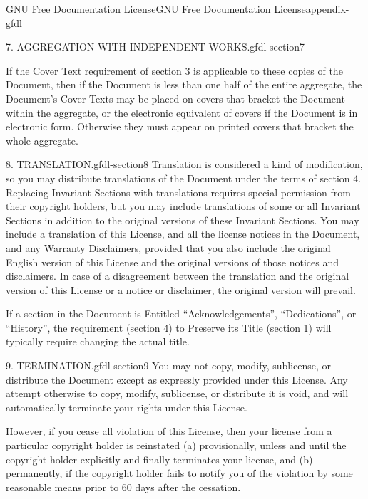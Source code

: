 \documentclass[oneside,10pt,]{book}
\numberwithin{equation}{section}
\begin{document}
\begin{appendixptx}{GNU Free Documentation License}{}{GNU Free Documentation License}{}{}{appendix-gfdl}
\begin{paragraphs}{7. AGGREGATION WITH INDEPENDENT WORKS.}{gfdl-section7}
\par
\hypertarget{p-1604}{}%
If the Cover Text requirement of section 3 is applicable to these copies of the Document, then if the Document is less than one half of the entire aggregate, the Document's Cover Texts may be placed on covers that bracket the Document within the aggregate, or the electronic equivalent of covers if the Document is in electronic form. Otherwise they must appear on printed covers that bracket the whole aggregate.%
\end{paragraphs}%
\begin{paragraphs}{8. TRANSLATION.}{gfdl-section8}%
\hypertarget{p-1605}{}%
Translation is considered a kind of modification, so you may distribute translations of the Document under the terms of section 4. Replacing Invariant Sections with translations requires special permission from their copyright holders, but you may include translations of some or all Invariant Sections in addition to the original versions of these Invariant Sections. You may include a translation of this License, and all the license notices in the Document, and any Warranty Disclaimers, provided that you also include the original English version of this License and the original versions of those notices and disclaimers. In case of a disagreement between the translation and the original version of this License or a notice or disclaimer, the original version will prevail.%
\par
\hypertarget{p-1606}{}%
If a section in the Document is Entitled ``Acknowledgements'', ``Dedications'', or ``History'', the requirement (section 4) to Preserve its Title (section 1) will typically require changing the actual title.%
\end{paragraphs}%
\begin{paragraphs}{9. TERMINATION.}{gfdl-section9}%
\hypertarget{p-1607}{}%
You may not copy, modify, sublicense, or distribute the Document except as expressly provided under this License. Any attempt otherwise to copy, modify, sublicense, or distribute it is void, and will automatically terminate your rights under this License.%
\par
\hypertarget{p-1608}{}%
However, if you cease all violation of this License, then your license from a particular copyright holder is reinstated (a) provisionally, unless and until the copyright holder explicitly and finally terminates your license, and (b) permanently, if the copyright holder fails to notify you of the violation by some reasonable means prior to 60 days after the cessation.%
\par

\end{paragraphs}
\end{appendixptx}
\end{document}
